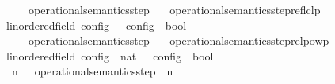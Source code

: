 \begin{isabellebody}
\isanewline
\ \ {\isacartoucheopen}{\isasymC}\ {\isasymhookrightarrow}\isactrlsup {\isacharplus}\isactrlsup {\isacharplus}\ {\isasymC}\ {\isasymequiv}\ operational{\isacharunderscore}semantics{\isacharunderscore}step\isactrlsup {\isacharplus}\isactrlsup {\isacharplus}\ {\isasymC}\ {\isasymC}\isanewline
\isanewline
{}\isamarkupfalse%
\ operational{\isacharunderscore}semantics{\isacharunderscore}step{\isacharunderscore}reflclp\isanewline
\ \ {\isacharcolon}{\isacharcolon}{\isacartoucheopen}{\isacharparenleft}{\isacharprime}{\isasymtau}{\isacharcolon}{\isacharcolon}linordered{\isacharunderscore}field{\isacharparenright}\ config\ {\isasymRightarrow}\ {\isacharprime}{\isasymtau}\ config\ {\isasymRightarrow}\ bool{\isacartoucheclose}\ \ \ \ \ \ \ \ \ \ \ \ \ \ {\isacharparenleft}{\isacartoucheopen}{\isacharunderscore}\ {\isasymhookrightarrow}\isactrlsup {\isacharequal}\isactrlsup {\isacharequal}\ {\isacharunderscore}{\isacartoucheclose}\ {}{}{\isacharparenright}\isanewline
{}\isanewline
\ \ {\isacartoucheopen}{\isasymC}\ {\isasymhookrightarrow}\isactrlsup {\isacharequal}\isactrlsup {\isacharequal}\ {\isasymC}\ {\isasymequiv}\ operational{\isacharunderscore}semantics{\isacharunderscore}step\isactrlsup {\isacharequal}\isactrlsup {\isacharequal}\ {\isasymC}\ {\isasymC}\isanewline
\isanewline
{}\isamarkupfalse%
\ operational{\isacharunderscore}semantics{\isacharunderscore}step{\isacharunderscore}relpowp\isanewline
\ \ {\isacharcolon}{\isacharcolon}{\isacartoucheopen}{\isacharparenleft}{\isacharprime}{\isasymtau}{\isacharcolon}{\isacharcolon}linordered{\isacharunderscore}field{\isacharparenright}\ config\ {\isasymRightarrow}\ nat\ {\isasymRightarrow}\ {\isacharprime}{\isasymtau}\ config\ {\isasymRightarrow}\ bool{\isacartoucheclose}\ \ \ \ \ \ \ {\isacharparenleft}{\isacartoucheopen}{\isacharunderscore}\ {\isasymhookrightarrow}\isactrlbsup {\isacharunderscore}\isactrlesup \ {\isacharunderscore}{\isacartoucheclose}\ {}{}{\isacharparenright}\isanewline
{}\isanewline
\ \ {\isacartoucheopen}{\isasymC}\ {\isasymhookrightarrow}\isactrlbsup n\isactrlesup \ {\isasymC}\ {\isasymequiv}\ {\isacharparenleft}operational{\isacharunderscore}semantics{\isacharunderscore}step\ {\isacharcircum}{\isacharcircum}\ n{\isacharparenright}\ {\isasymC}\ {\isasymC}\isanewline

\end{isabellebody}
